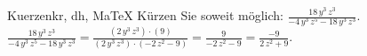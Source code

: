 \begin{MAufgabe}{Kuerzen}{kr, dh, MaTeX}
K\"urzen Sie soweit m\"oglich: $\frac{18\, y^3\, z^3}{ - 4\, y^3\, z^5 - 18\, y^3\, z^3}$.\\ 
\ifLsg\MLoesung
\quad $\frac{18\, y^3\, z^3}{ - 4\, y^3\, z^5 - 18\, y^3\, z^3}=\frac{(2\, y^3\, z^3)\cdot(9)}{(2\, y^3\, z^3)\cdot( - 2\, z^2 - 9)}=\frac{9}{ - 2\, z^2 - 9}=\frac{-9}{2\, z^2 + 9}$.\else\relax\fi
 \end{MAufgabe}